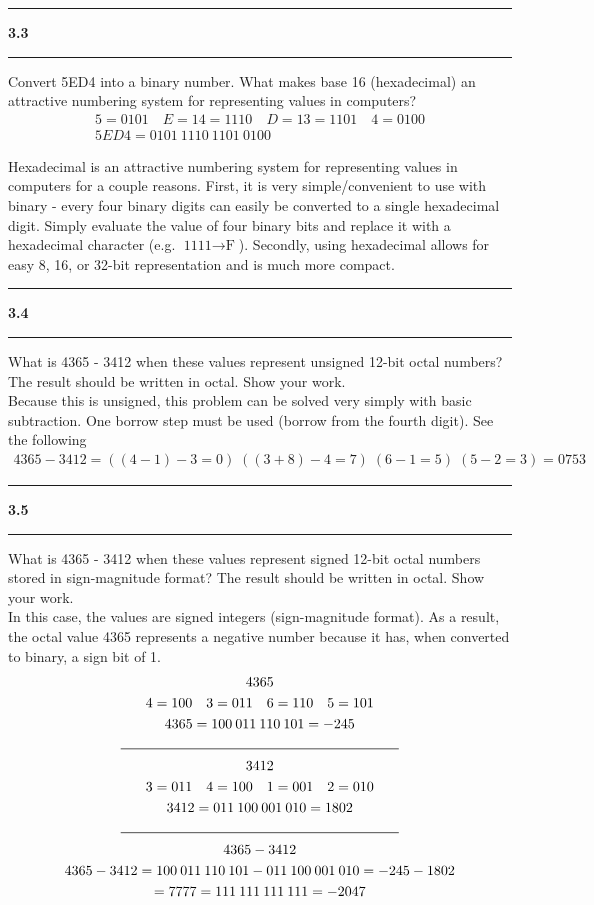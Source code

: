 \documentclass[11pt]{article}
\newcommand\question[2]{\vspace{.25in}\hrule\textbf{#1 #2}\vspace{.5em}\hrule\vspace{.10in}}
\begin{document}
\question{3.3}{} 
Convert 5ED4 into a binary number. What makes base 16 (hexadecimal) an attractive numbering system for representing values in computers?\\[1em]

\begin{gather*}
5 = 0101 \quad E = 14 = 1110 \quad D = 13 = 1101 \quad 4 = 0100 \\
5ED4 = 0101 \: 1110 \: 1101 \: 0100
\end{gather*}

Hexadecimal is an attractive numbering system for representing values in computers for a couple reasons. First, it is very simple/convenient to use with binary - every four binary digits can easily be converted to a single hexadecimal digit. Simply evaluate the value of four binary bits and replace it with a hexadecimal character (e.g.  \(\text{1111} \rightarrow \text{F}\)). Secondly, using hexadecimal allows for easy 8, 16, or 32-bit representation and is much more compact. 

\question{3.4}{} 
What is 4365 - 3412 when these values represent unsigned 12-bit octal numbers? The result should be written in octal. Show your work.\\[1em]

Because this is unsigned, this problem can be solved very simply with basic subtraction. One borrow step must be used (borrow from the fourth digit). See the following
\begin{gather*}
4365 -3412 = ((4-1) - 3 = 0) \; ((3+8) - 4 = 7) \; (6 - 1 = 5) \; (5 - 2 = 3) = 0753
\end{gather*}


\question{3.5}{} 
What is 4365 - 3412 when these values represent signed 12-bit octal numbers stored in sign-magnitude format?  The result should be written in octal. Show your work.\\[1em]

In this case, the values are signed integers (sign-magnitude format). As a result, the octal value 4365 represents a negative number because it has, when converted to binary, a sign bit of 1. 
\begin{gather*}
4365 \\
4 = 100 \quad 3 = 011 \quad 6 = 110 \quad 5 = 101 \\
4365 = 100 \: 011 \: 110 \: 101 = -245 \\
\rule{7cm}{.5pt} \\
3412 \\
3 = 011 \quad 4 = 100 \quad 1 = 001 \quad 2 = 010 \\
3412 = 011 \: 100 \: 001 \: 010 = 1802 \\
\rule{7cm}{.5pt} \\
4365 - 3412 \\
4365 - 3412 =100 \: 011 \: 110 \: 101 - 011 \: 100 \: 001 \: 010 = -245 - 1802 \\
= 7777 =  111 \: 111 \: 111 \: 111 = -2047
\end{gather*}
\end{document}
